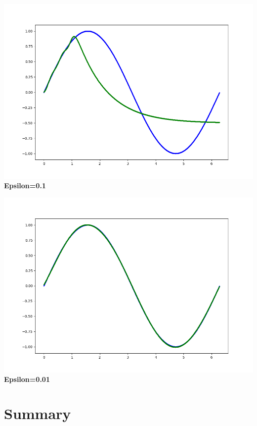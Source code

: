 \documentclass[12pt, letter]{article}
\begin{document}
\includegraphics[width=.8\textwidth]{images/Figure_2.png}
\newline
\centering
\textbf{Epsilon=0.1} 

\includegraphics[width=.8\textwidth]{images/Figure_3.png}
\newline
\centering
\textbf{Epsilon=0.01} 

\break
\raggedright

\section{Summary}
\end{document}
